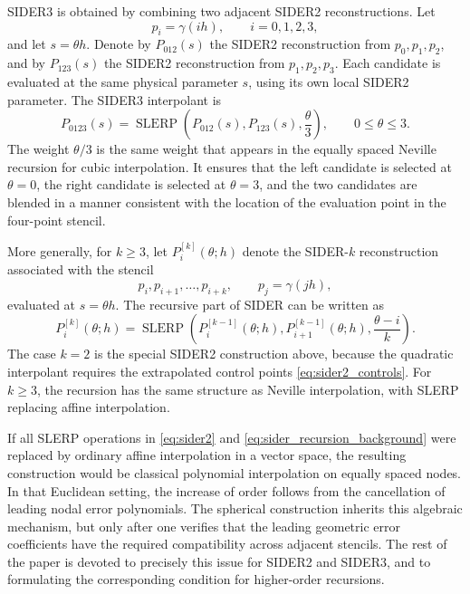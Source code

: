 \documentclass[a4paper,11pt]{article}
\newcommand{\SLERP}{\operatorname{SLERP}}
\numberwithin{equation}{section}
\begin{document}
SIDER3 is obtained by combining two adjacent SIDER2 reconstructions.  Let
\[
        p_i=\gamma(ih),\qquad i=0,1,2,3,
\]
and let \(s=\theta h\).  Denote by \(P_{012}(s)\) the SIDER2 reconstruction
from \(p_0,p_1,p_2\), and by \(P_{123}(s)\) the SIDER2 reconstruction from
\(p_1,p_2,p_3\).  Each candidate is evaluated at the same physical parameter
\(s\), using its own local SIDER2 parameter.  The SIDER3 interpolant is
\begin{equation}
\label{eq:sider3}
P_{0123}(s)
=
\SLERP\left(
        P_{012}(s),
        P_{123}(s),
        \frac{\theta}{3}
       \right),
        \qquad 0\leq \theta\leq 3 .
\end{equation}
The weight \(\theta/3\) is the same weight that appears in the equally spaced
Neville recursion for cubic interpolation.  It ensures that the left
candidate is selected at \(\theta=0\), the right candidate is selected at
\(\theta=3\), and the two candidates are blended in a manner consistent with
the location of the evaluation point in the four-point stencil.

More generally, for \(k\geq3\), let \(P_i^{[k]}(\theta;h)\) denote the
SIDER-\(k\) reconstruction associated with the stencil
\[
        p_i,p_{i+1},\ldots,p_{i+k},
        \qquad p_j=\gamma(jh),
\]
evaluated at \(s=\theta h\).  The recursive part of SIDER can be written as
\begin{equation}
\label{eq:sider_recursion_background}
P_i^{[k]}(\theta;h)
=
\SLERP\!\left(
        P_i^{[k-1]}(\theta;h),
        P_{i+1}^{[k-1]}(\theta;h),
        \frac{\theta-i}{k}
       \right).
\end{equation}
The case \(k=2\) is the special SIDER2 construction above, because the
quadratic interpolant requires the extrapolated control points
\eqref{eq:sider2_controls}.  For \(k\geq3\), the recursion has the same
structure as Neville interpolation, with SLERP replacing affine interpolation.

If all SLERP operations in \eqref{eq:sider2} and
\eqref{eq:sider_recursion_background} were replaced by ordinary affine
interpolation in a vector space, the resulting construction would be classical
polynomial interpolation on equally spaced nodes.  In that Euclidean setting,
the increase of order follows from the cancellation of leading nodal error
polynomials.  The spherical construction inherits this algebraic mechanism,
but only after one verifies that the leading geometric error coefficients have
the required compatibility across adjacent stencils.  The rest of the paper is
devoted to precisely this issue for SIDER2 and SIDER3, and to formulating the
corresponding condition for higher-order recursions.
\end{document}
